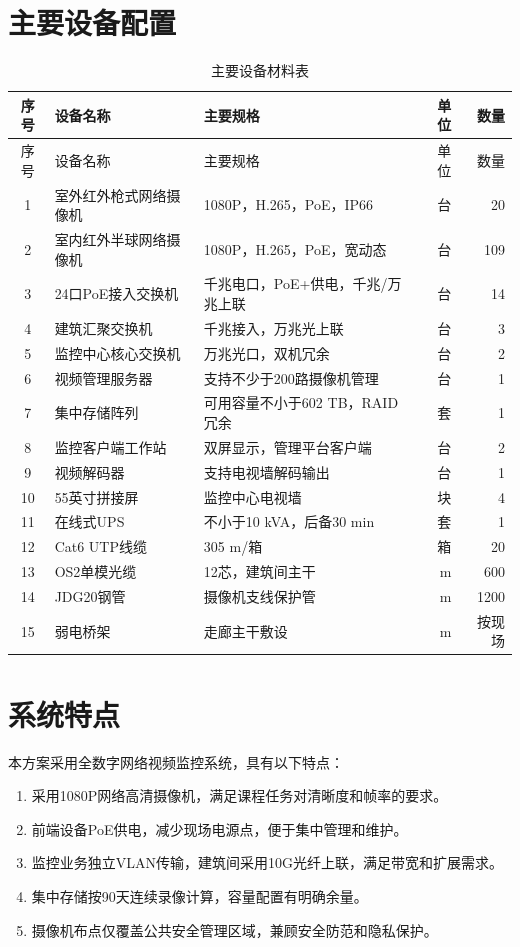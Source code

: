 \documentclass[UTF8,zihao=-4,openany]{ctexrep}
\begin{document}
\section{主要设备配置}
\begin{longtable}{cllrr}
\caption{主要设备材料表}\\
\toprule
序号&设备名称&主要规格&单位&数量\\
\midrule
\endfirsthead
\toprule
序号&设备名称&主要规格&单位&数量\\
\midrule
\endhead
1&室外红外枪式网络摄像机&1080P，H.265，PoE，IP66&台&20\\
2&室内红外半球网络摄像机&1080P，H.265，PoE，宽动态&台&109\\
3&24口PoE接入交换机&千兆电口，PoE+供电，千兆/万兆上联&台&14\\
4&建筑汇聚交换机&千兆接入，万兆光上联&台&3\\
5&监控中心核心交换机&万兆光口，双机冗余&台&2\\
6&视频管理服务器&支持不少于200路摄像机管理&台&1\\
7&集中存储阵列&可用容量不小于602 TB，RAID冗余&套&1\\
8&监控客户端工作站&双屏显示，管理平台客户端&台&2\\
9&视频解码器&支持电视墙解码输出&台&1\\
10&55英寸拼接屏&监控中心电视墙&块&4\\
11&在线式UPS&不小于10 kVA，后备30 min&套&1\\
12&Cat6 UTP线缆&305 m/箱&箱&20\\
13&OS2单模光缆&12芯，建筑间主干&m&600\\
14&JDG20钢管&摄像机支线保护管&m&1200\\
15&弱电桥架&走廊主干敷设&m&按现场\\
\bottomrule
\end{longtable}

\section{系统特点}
本方案采用全数字网络视频监控系统，具有以下特点：
\begin{enumerate}
  \item 采用1080P网络高清摄像机，满足课程任务对清晰度和帧率的要求。
  \item 前端设备PoE供电，减少现场电源点，便于集中管理和维护。
  \item 监控业务独立VLAN传输，建筑间采用10G光纤上联，满足带宽和扩展需求。
  \item 集中存储按90天连续录像计算，容量配置有明确余量。
  \item 摄像机布点仅覆盖公共安全管理区域，兼顾安全防范和隐私保护。
\end{enumerate}
\end{document}
